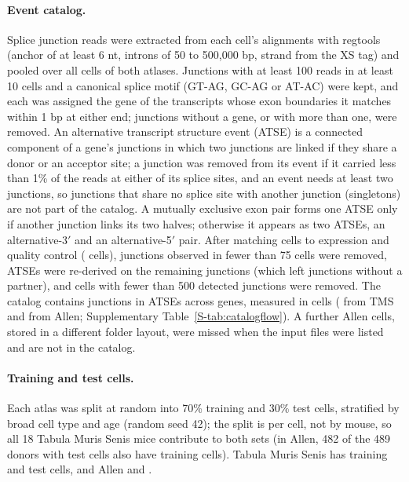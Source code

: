 \paragraph{Event catalog.}
Splice junction reads were extracted from each cell's alignments with regtools \cite{regtools} (anchor of at least 6 nt,
introns of 50 to 500{,}000 bp, strand from the XS tag) and pooled over all \FlowCellsReadable{} cells of both atlases.
Junctions with at least 100 reads in at least 10 cells and a canonical splice motif (GT-AG, GC-AG or AT-AC) were kept,
and each was assigned the gene of the transcripts whose exon boundaries it matches within 1 bp at either end; junctions
without a gene, or with more than one, were removed. An alternative transcript structure event (ATSE) is a connected
component of a gene's junctions in which two junctions are linked if they share a donor or an acceptor site; a junction
was removed from its event if it carried less than 1\% of the reads at either of its splice sites, and an event needs at
least two junctions, so junctions that share no splice site with another junction (singletons) are not part of the
catalog. A mutually exclusive exon pair forms one ATSE only if another junction links its two halves; otherwise it
appears as two ATSEs, an alternative-3$'$ and an alternative-5$'$ pair. After matching cells to expression and quality
control (\FlowCellsQC{} cells), junctions observed in fewer than 75 cells were removed, ATSEs were re-derived on the
remaining junctions (which left \FlowSingletonsRegroup{} junctions without a partner), and cells with fewer than 500
detected junctions were removed. The catalog contains \CatalogJunctionsMouse{} junctions in \CatalogATSEsMouse{} ATSEs
across \CatalogGenesMouse{} genes, measured in \CatalogCellsMouse{} cells (\CatalogCellsTMS{} from TMS and
\CatalogCellsAllen{} from Allen; Supplementary Table~\ref{S-tab:catalogflow}). A further \FlowAllenOmitted{} Allen cells,
stored in a different folder layout, were missed when the input files were listed and are not in the catalog.

\paragraph{Training and test cells.}
Each atlas was split at random into 70\% training and 30\% test cells, stratified by broad cell type and age (random seed
42); the split is per cell, not by mouse, so all 18 Tabula Muris Senis mice contribute to both sets (in Allen, 482 of
the 489 donors with test cells also have training cells). Tabula Muris Senis has \SplitTrainTMS{} training and
\SplitTestTMS{} test cells, and Allen \SplitTrainAllen{} and \SplitTestAllen{}.
